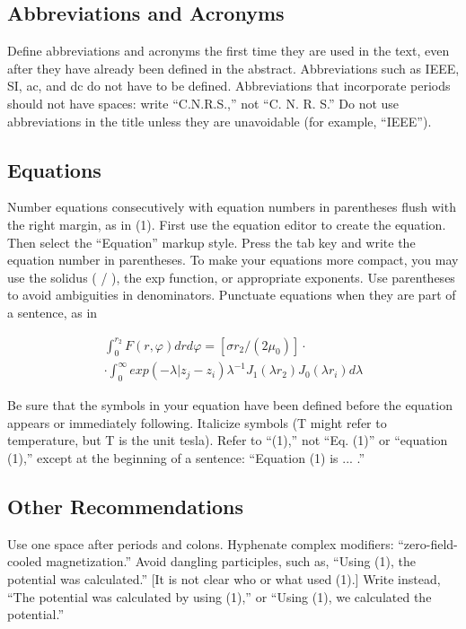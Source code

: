 \documentclass[journal,a4paper,onecolumn]{IEEEtran}
\begin{document}
\subsection{Abbreviations and Acronyms}

Define abbreviations and acronyms the first time they are used in the text, even after they have already been defined in the abstract. Abbreviations such as IEEE, SI, ac, and dc do not have to be defined. Abbreviations that incorporate periods should not have spaces: write ``C.N.R.S.,'' not ``C. N. R. S.'' Do not use abbreviations in the title unless they are unavoidable (for example, ``IEEE'').

\subsection{Equations}

Number equations consecutively with equation numbers in parentheses flush with the right margin, as in (1). First use the equation editor to create the equation. Then select the ``Equation'' markup style. Press the tab key and write the equation number in parentheses. To make your equations more compact, you may use the solidus ( / ), the exp function, or appropriate exponents. Use parentheses to avoid ambiguities in denominators. Punctuate equations when they are part of a sentence, as in

\begin{equation}
	\begin{split}
		\int_{0}^{r_2}F(r,\varphi)dr d\varphi=[\sigma r_2/(2\mu _0)]\cdot \\ \cdot\int_{0}^{\infty}exp(-\lambda|z_j-z_i)\lambda^{-1}J_1(\lambda r_2)J_0(\lambda r_i)d\lambda
	\end{split}
\end{equation}


Be sure that the symbols in your equation have been defined before the equation appears or immediately following. Italicize symbols (T might refer to temperature, but T is the unit tesla). Refer to ``(1),'' not ``Eq. (1)'' or ``equation (1),'' except at the beginning of a sentence: ``Equation (1) is ... .''

\subsection{Other Recommendations}

Use one space after periods and colons. Hyphenate complex modifiers: ``zero-field-cooled magnetization.'' Avoid dangling participles, such as, ``Using (1), the potential was calculated.'' [It is not clear who or what used (1).] Write instead, ``The potential was calculated by using (1),'' or ``Using (1), we calculated the potential.''
\end{document}
